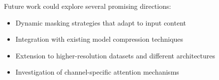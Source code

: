 \documentclass{article} %
\begin{document}
Future work could explore several promising directions:
\begin{itemize}
    \item Dynamic masking strategies that adapt to input content
    \item Integration with existing model compression techniques \citep{Han2015DeepCC}
    \item Extension to higher-resolution datasets and different architectures \citep{Howard2017MobileNetsEC}
    \item Investigation of channel-specific attention mechanisms \citep{Jaderberg2015SpatialTN}
\end{itemize}



\end{document}
